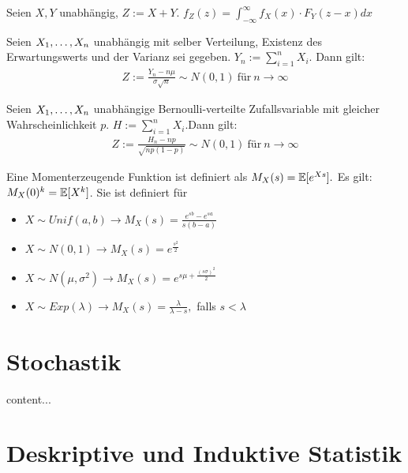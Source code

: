 \begin{satz}[Faltungssatz]
	Seien $X,Y$ unabhängig, $Z := X + Y$. $f_Z(z) = \int_{- \infty}^{\infty} f_X(x) \cdot F_Y(z-x) dx $
\end{satz}

\begin{satz}
	Seien $X_1, \dots, X_n$ unabhängig mit selber Verteilung, Existenz des Erwartungswerts und der Varianz sei gegeben. $Y_n := \sum_{i=1}^{n}X_i$. Dann gilt:
	\begin{align*}
		Z := \frac{Y_n - n \mu}{\sigma \sqrt{n}} \sim N(0,1) \medspace \text{für} \medspace n \rightarrow \infty
	\end{align*}
\end{satz}

\begin{satz}
	Seien $X_1, \dots, X_n$ unabhängige Bernoulli-verteilte Zufallsvariable mit gleicher Wahrscheinlichkeit $p$. $H := \sum_{i = 1}^n X_i$.Dann gilt:
	\begin{align*}
	Z := \frac{H_n - np}{\sqrt{np(1-p)}} \sim N(0,1)\medspace \text{für} \medspace n \rightarrow \infty
	\end{align*}
\end{satz}

\begin{satz}
	Eine Momenterzeugende Funktion ist definiert als $M_X(s) = \mathbb{E}[e^{Xs}].$ Es gilt: $M_X(0)^k = \mathbb{E}[X^k]$. Sie ist definiert für
	\begin{itemize}[noitemsep]
		\item $X \sim Unif(a,b) \rightarrow M_X(s) = \frac{e^{sb} - e^{sa}}{s(b-a)}$
		\item $X \sim N(0,1) \rightarrow M_X(s) = e^{\frac{s^2}{2}}$
		\item $X \sim N(\mu,\sigma^2) \rightarrow M_X(s) = e^{s\mu + \frac{(s \sigma)^2}{2}} $
		\item $X \sim Exp(\lambda) \rightarrow M_X(s) = \frac{\lambda}{\lambda - s} ,$ falls $s < \lambda$
	\end{itemize}
\end{satz}

\pagebreak

\section{Stochastik}

\begin{definition}
	content...
\end{definition}

\pagebreak

\section{Deskriptive und Induktive Statistik}

\pagebreak
